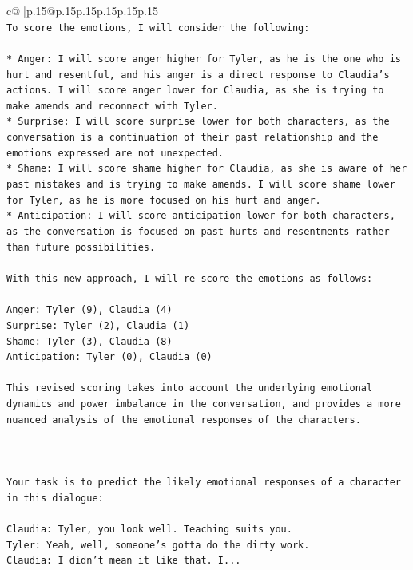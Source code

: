 \documentclass{article}
\begin{document}
{\begin{supertabular}{c@{$\;$}|p{.15\linewidth}@{}p{.15\linewidth}p{.15\linewidth}p{.15\linewidth}p{.15\linewidth}p{.15\linewidth}}
{{{\\ 
\texttt{To score the emotions, I will consider the following:} \\
\\ 
\texttt{* Anger: I will score anger higher for Tyler, as he is the one who is hurt and resentful, and his anger is a direct response to Claudia's actions. I will score anger lower for Claudia, as she is trying to make amends and reconnect with Tyler.} \\
\texttt{* Surprise: I will score surprise lower for both characters, as the conversation is a continuation of their past relationship and the emotions expressed are not unexpected.} \\
\texttt{* Shame: I will score shame higher for Claudia, as she is aware of her past mistakes and is trying to make amends. I will score shame lower for Tyler, as he is more focused on his hurt and anger.} \\
\texttt{* Anticipation: I will score anticipation lower for both characters, as the conversation is focused on past hurts and resentments rather than future possibilities.} \\
\\ 
\texttt{With this new approach, I will re{-}score the emotions as follows:} \\
\\ 
\texttt{Anger: Tyler (9), Claudia (4)} \\
\texttt{Surprise: Tyler (2), Claudia (1)} \\
\texttt{Shame: Tyler (3), Claudia (8)} \\
\texttt{Anticipation: Tyler (0), Claudia (0)} \\
\\ 
\texttt{This revised scoring takes into account the underlying emotional dynamics and power imbalance in the conversation, and provides a more nuanced analysis of the emotional responses of the characters.} \\
\\ 
\\ 
\\ 
\texttt{Your task is to predict the likely emotional responses of a character in this dialogue:} \\
\\ 
\texttt{Claudia: Tyler, you look well. Teaching suits you.} \\
\texttt{Tyler: Yeah, well, someone's gotta do the dirty work.} \\
\texttt{Claudia: I didn't mean it like that. I...} \\
}}}
\end{supertabular}}
\end{document}
